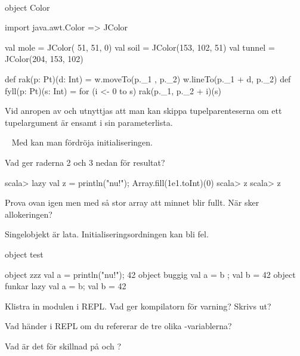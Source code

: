 \SOLUTION

\TaskSolved \what~

\SubtaskSolved
\begin{Code}
object Color {
  import java.awt.{Color => JColor}

  val mole   = JColor( 51,  51,   0)
  val soil   = JColor(153, 102,  51)
  val tunnel = JColor(204, 153, 102)
}
\end{Code}

\SubtaskSolved

\begin{Code}
def rak(p: Pt)(d: Int)  = {
  w.moveTo(p._1    , p._2)
  w.lineTo(p._1 + d, p._2)
}
def fyll(p: Pt)(s: Int) = for (i <- 0 to s) rak(p._1, p._2 + i)(s)
\end{Code}

\SubtaskSolved Vid anropen av  och  utnyttjas att man kan skippa tupelparenteserna om ett tupelargument är ensamt i sin parameterlista.



\QUESTEND




\QUESTBEGIN

\Task \what~ Med  kan man fördröja initialiseringen.

\Subtask Vad ger raderna 2 och 3 nedan för resultat?
\begin{REPL}
scala> lazy val z = { println("nu!"); Array.fill(1e1.toInt)(0)}
scala> z
scala> z
\end{REPL}

\Subtask Prova ovan igen men med så stor array att minnet blir fullt. När sker allokeringen?

\Subtask Singelobjekt är lata. Initialiseringsordningen kan bli fel.
\begin{Code}
object test {
  object zzz    { val a = { println("nu!"); 42} }
  object buggig { val a = b ; val b = 42        }
  object funkar { lazy val a = b; val b = 42    }

}
\end{Code}
\noindent Klistra in modulen  i REPL. Vad ger kompilatorn för varning? Skrivs   ut?

\Subtask Vad händer i REPL om du refererar de tre olika -variablerna?

\Subtask Vad är det för skillnad på  och ?

\SOLUTION

